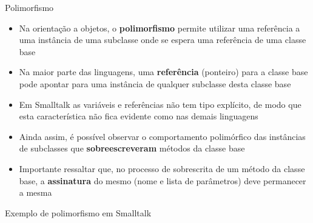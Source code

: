 \begin{frame}[fragile]{Polimorfismo}

    \begin{itemize}
        \item Na orientação a objetos, o \textbf{polimorfismo} permite utilizar uma referência a 
            uma instância de uma subclasse onde se espera uma referência de uma classe base

        \item Na maior parte das linguagens, uma \textbf{referência} (ponteiro) para a classe base 
            pode apontar para uma instância de qualquer subclasse desta classe base

        \item Em Smalltalk as variáveis e referências não tem tipo explícito, de modo que esta
            característica não fica evidente como nas demais linguagens

        \item Ainda assim, é possível observar o comportamento polimórfico das instâncias de 
            subclasses que \textbf{sobreescreveram} métodos da classe base

        \item Importante ressaltar que, no processo de sobrescrita de um método da classe base,
            a \textbf{assinatura} do mesmo (nome e lista de parâmetros) deve permanecer a mesma
    \end{itemize}

\end{frame}

\begin{frame}[fragile]{Exemplo de polimorfismo em Smalltalk}
\end{frame}


